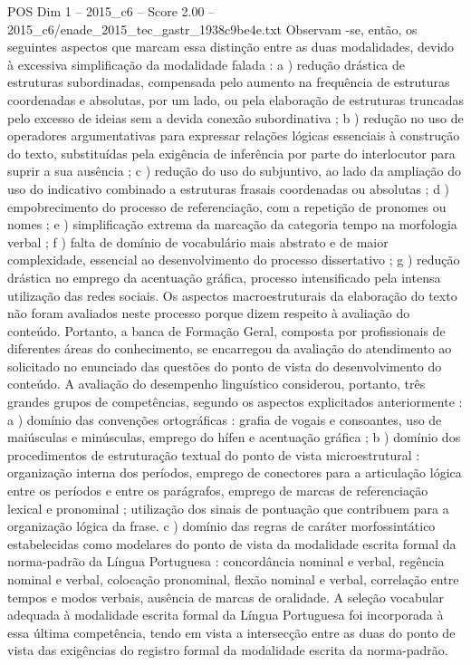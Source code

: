 \begin{textsample}{POS Dim 1 – 2015\_c6 – Score 2.00 – 2015\_c6/enade\_2015\_tec\_gastr\_1938c9be4e.txt}
Observam -se, então, os seguintes aspectos que marcam essa distinção entre as duas modalidades, devido à excessiva simplificação da modalidade falada : a ) redução drástica de estruturas subordinadas, compensada pelo aumento na frequência de estruturas coordenadas e absolutas, por um lado, ou pela elaboração de estruturas truncadas pelo excesso de ideias sem a devida conexão subordinativa ; b ) redução no uso de operadores argumentativas para expressar relações lógicas essenciais à construção do texto, substituídas pela exigência de inferência por parte do interlocutor para suprir a sua ausência ; c ) redução do uso do subjuntivo, ao lado da ampliação do uso do indicativo combinado a estruturas frasais coordenadas ou absolutas ; d ) empobrecimento do processo de referenciação, com a repetição de pronomes ou nomes ; e ) simplificação extrema da marcação da categoria tempo na morfologia verbal ; f ) falta de domínio de vocabulário mais abstrato e de maior complexidade, essencial ao desenvolvimento do processo dissertativo ; g ) redução drástica no emprego da acentuação gráfica, processo intensificado pela intensa utilização das redes sociais.
Os aspectos macroestruturais da elaboração do texto não foram avaliados neste processo porque dizem respeito à avaliação do conteúdo.
Portanto, a banca de Formação Geral, composta por profissionais de diferentes áreas do conhecimento, se encarregou da avaliação do atendimento ao solicitado no enunciado das questões do ponto de vista do desenvolvimento do conteúdo.
A avaliação do desempenho linguístico considerou, portanto, três grandes grupos de competências, segundo os aspectos explicitados anteriormente : a ) domínio das convenções ortográficas : grafia de vogais e consoantes, uso de maiúsculas e minúsculas, emprego do hífen e acentuação gráfica ; b ) domínio dos procedimentos de estruturação textual do ponto de vista microestrutural : organização interna dos períodos, emprego de conectores para a articulação lógica entre os períodos e entre os parágrafos, emprego de marcas de referenciação lexical e pronominal ; utilização dos sinais de pontuação que contribuem para a organização lógica da frase. c ) domínio das regras de caráter morfossintático estabelecidas como modelares do ponto de vista da modalidade escrita formal da norma-padrão da Língua Portuguesa : concordância nominal e verbal, regência nominal e verbal, colocação pronominal, flexão nominal e verbal, correlação entre tempos e modos verbais, ausência de marcas de oralidade.
A seleção vocabular adequada à modalidade escrita formal da Língua Portuguesa foi incorporada à essa última competência, tendo em vista a intersecção entre as duas do ponto de vista das exigências do registro formal da modalidade escrita da norma-padrão.

\end{textsample}
